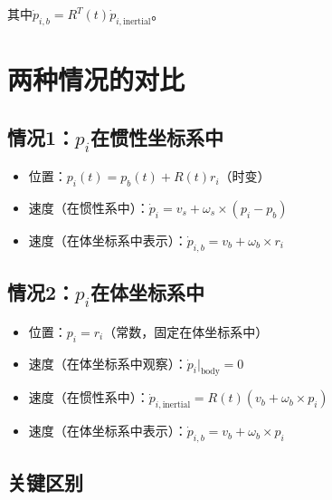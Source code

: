 \documentclass[12pt,a4paper]{article}
\begin{document}
其中$\dot{p}_{i,b} = R^T(t) \dot{p}_{i,\text{inertial}}$。

\section{两种情况的对比}

\subsection{情况1：$p_i$在惯性坐标系中}

\begin{itemize}
\item 位置：$p_i(t) = p_b(t) + R(t) r_i$（时变）
\item 速度（在惯性系中）：$\dot{p}_i = v_s + \omega_s \times (p_i - p_b)$
\item 速度（在体坐标系中表示）：$\dot{p}_{i,b} = v_b + \omega_b \times r_i$
\end{itemize}

\subsection{情况2：$p_i$在体坐标系中}

\begin{itemize}
\item 位置：$p_i = r_i$（常数，固定在体坐标系中）
\item 速度（在体坐标系中观察）：$\dot{p}_i\Big|_{\text{body}} = 0$
\item 速度（在惯性系中）：$\dot{p}_{i,\text{inertial}} = R(t) (v_b + \omega_b \times p_i)$
\item 速度（在体坐标系中表示）：$\dot{p}_{i,b} = v_b + \omega_b \times p_i$
\end{itemize}

\subsection{关键区别}
\end{document}
